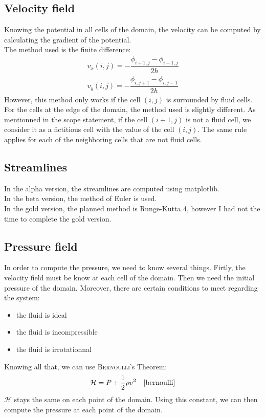\subsection{Velocity field}
Knowing the potential in all cells of the domain, the velocity can be computed
by calculating the gradient of the potential.\\
The method used is the finite difference:
\[
      \begin{array}{c}
            v_x(i, j) = - \dfrac{\phi_{i+1, j} - \phi_{i-1, j}}{2h}\\
            v_y(i, j) = - \dfrac{\phi_{i, j+1} - \phi_{i, j-1}}{2h}
      \end{array}
\]
However, this method only works if the cell $(i, j)$ is surrounded by fluid
cells. For the cells at the edge of the domain, the method used is slightly
different. As mentionned in the scope statement\cite{scope-statement}, if the
cell $(i+1, j)$ is not a fluid cell, we consider it as a fictitious cell with
the value of the cell $(i, j)$. The same rule applies for each of the
neighboring cells that are not fluid cells.

\subsection{Streamlines}
In the alpha version, the streamlines are computed using matplotlib.\\
In the beta version, the method of Euler is used.\\
In the gold version, the planned method is Runge-Kutta 4, however I had not the
time to complete the gold version.

\subsection{Pressure field}
In order to compute the pressure, we need to know several things. Firtly, the
velocity field must be know at each cell of the domain. Then we need the
initial pressure of the domain. Moreover, there are certain conditions to meet
regarding the system:
\begin{itemize}[noitemsep]
      \item the fluid is ideal\\
      \item the fluid is incompressible\\
      \item the fluid is irrotationnal
\end{itemize}
Knowing all that, we can use \textsc{Bernoulli}'s Theorem:
\[
      \mathcal{H} = P + \dfrac{1}{2} \rho v^2 \quad \text{\cite{bernoulli}}
\]
$\mathcal{H}$ stays the same on each point of the domain. Using this constant,
we can then compute the pressure at each point of the domain.

